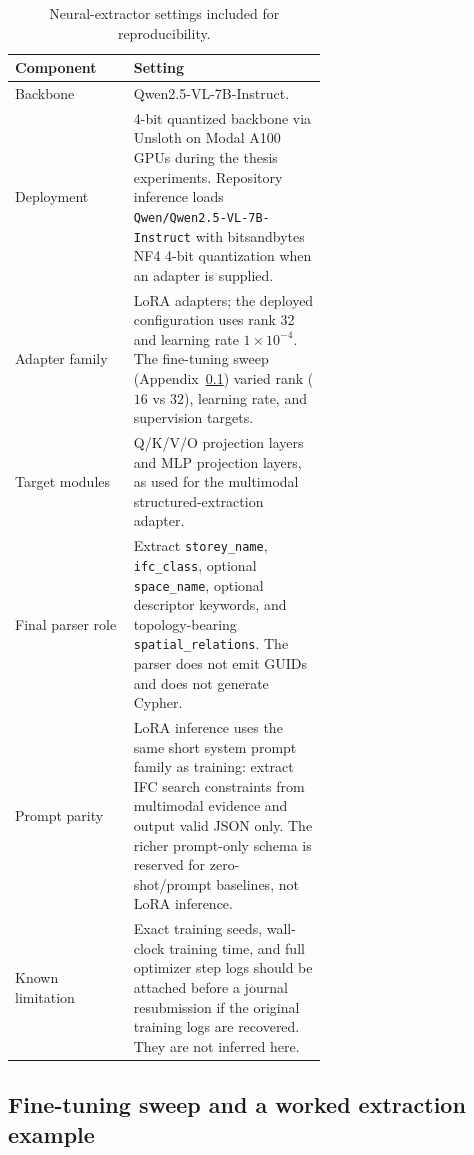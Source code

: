 \begin{table}[ht]
  \centering
  \small
  \begin{tabular}{lp{0.62\linewidth}}
    \toprule
    Component & Setting \\
    \midrule
    Backbone & Qwen2.5-VL-7B-Instruct. \\
    Deployment & 4-bit quantized backbone via Unsloth on Modal A100 GPUs during the thesis experiments. Repository inference loads \texttt{Qwen/Qwen2.5-VL-7B-Instruct} with bitsandbytes NF4 4-bit quantization when an adapter is supplied. \\
    Adapter family & LoRA adapters; the deployed configuration uses rank 32 and learning rate $1\times10^{-4}$. The fine-tuning sweep (Appendix~\ref{app:sweep}) varied rank ($16$ vs $32$), learning rate, and supervision targets. \\
    Target modules & Q/K/V/O projection layers and MLP projection layers, as used for the multimodal structured-extraction adapter. \\
    Final parser role & Extract \texttt{storey\_name}, \texttt{ifc\_class}, optional \texttt{space\_name}, optional descriptor keywords, and topology-bearing \texttt{spatial\_relations}. The parser does not emit GUIDs and does not generate Cypher. \\
    Prompt parity & LoRA inference uses the same short system prompt family as training: extract IFC search constraints from multimodal evidence and output valid JSON only. The richer prompt-only schema is reserved for zero-shot/prompt baselines, not LoRA inference. \\
    Known limitation & Exact training seeds, wall-clock training time, and full optimizer step logs should be attached before a journal resubmission if the original training logs are recovered. They are not inferred here. \\
    \bottomrule
  \end{tabular}
  \caption{Neural-extractor settings included for reproducibility.}
  \label{tab:app-lora}
\end{table}
\clearpage

\subsection{Fine-tuning sweep and a worked extraction example}
\label{app:sweep}

